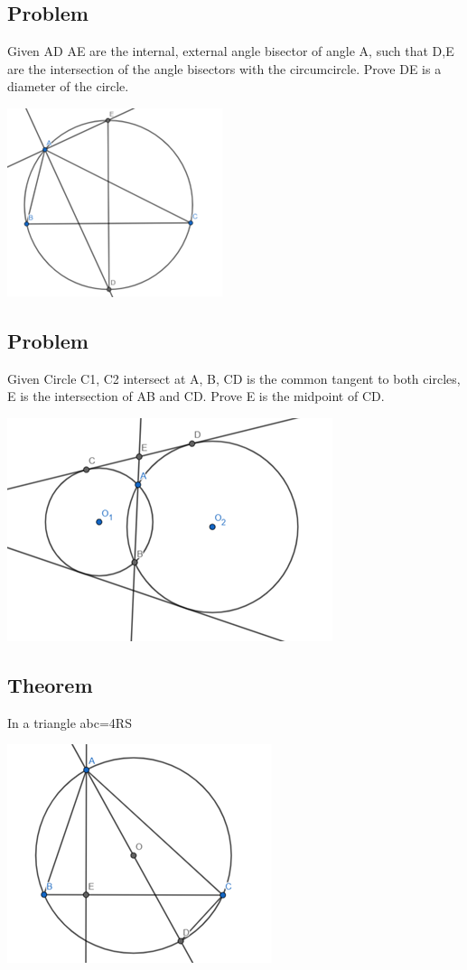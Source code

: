 \documentclass{article}
\begin{document}
\subsection{Problem}
Given AD AE are the internal, external angle bisector of angle A,
 such that D,E are the intersection of the angle bisectors with the circumcircle. 
 Prove DE is a diameter of the circle.

\includegraphics{Picture16.png}

\vspace{50px}

\subsection{Problem}
Given Circle C1, C2 intersect at A, B, CD is the common tangent to both circles, 
E is the intersection of AB and CD. Prove E is the midpoint of CD.

\includegraphics{Picture17.png}

\pagebreak

\subsection{Theorem}
In a triangle abc=4RS

\includegraphics{Picture18.png}
\end{document}
